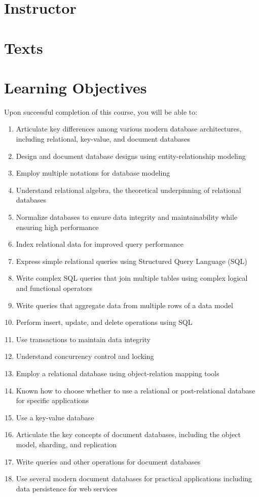 \documentclass[11pt]{article}
\begin{document}

\section{Instructor}



\section{Texts}



\section{Learning Objectives}

Upon successful completion of this course,
you will be able to:
\begin{enumerate}
\item Articulate key differences among various modern database architectures,
  including relational, key-value, and document databases
\item Design and document database designs using entity-relationship modeling
\item Employ multiple notations for database modeling
\item Understand relational algebra,
  the theoretical underpinning of relational databases
\item Normalize databases to ensure data integrity and maintainability
  while ensuring high performance
\item Index relational data for improved query performance
\item Express simple relational queries using Structured Query Language (SQL)
\item Write complex SQL queries
  that join multiple tables
  using complex logical and functional operators
\item Write queries that aggregate data from multiple rows of a data model
\item Perform insert, update, and delete operations using SQL
\item Use transactions to maintain data integrity
\item Understand concurrency control and locking
\item Employ a relational database using object-relation mapping tools
\item Known how to choose whether to use a relational or post-relational
  database for specific applications
\item Use a key-value database
\item Articulate the key concepts of document databases,
  including the object model, sharding, and replication
\item Write queries and other operations for document databases
\item Use several modern document databases for practical applications
  including data persistence for web services
\end{enumerate}
\end{document}
